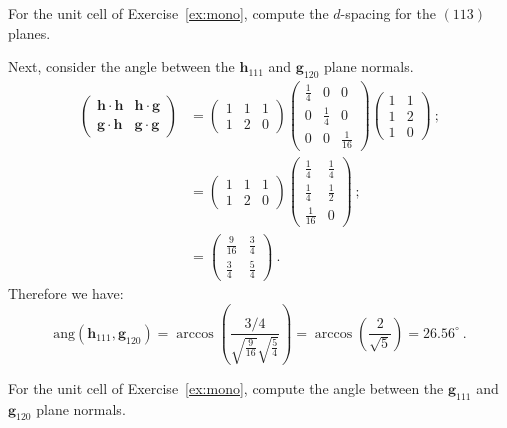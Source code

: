 \begin{exercise}
For the unit cell of Exercise~\ref{ex:mono}, compute the $d$-spacing for the $(113)$ planes.
\end{exercise}

\begin{example}
Next, consider the angle between the $\mathbf{h}_{111}$ and $\mathbf{g}_{120}$ plane normals.  
\begin{align*}
	\left(\begin{array}{cc}\mathbf{h}\cdot\mathbf{h}&\mathbf{h}\cdot\mathbf{g}\\
	\mathbf{g}\cdot\mathbf{h}&\mathbf{g}\cdot\mathbf{g}\end{array}\right) &= \left(\begin{array}{ccc}1 & 1 & 1\\ 1 & 2 & 0\end{array}\right)
	\left(\begin{array}{ccc}
			\frac{1}{4} & 0 & 0\\
			0 & \frac{1}{4} & 0\\
			0 & 0 & \frac{1}{16}\end{array}\right)\left(\begin{array}{cc} 1 & 1\\ 1 & 2\\ 1 & 0\end{array}\right)\ ;\\
	&= \left(\begin{array}{ccc}1 & 1 & 1\\ 1 & 2 & 0\end{array}\right)
	\left(\begin{array}{cc} \frac{1}{4} & \frac{1}{4}\\ \frac{1}{4} & \frac{1}{2}\\ \frac{1}{16} & 0\end{array}\right)\ ; \\
	&= \left(\begin{array}{cc}\frac{9}{16} & \frac{3}{4} \\ \frac{3}{4} & \frac{5}{4} \end{array}\right)\ .
\end{align*}
Therefore we have:
\[
	\text{ang}(\mathbf{h}_{111},\mathbf{g}_{120}) = \arccos\left(\frac{3/4}{\sqrt{\frac{9}{16}}\sqrt{\frac{5}{4}}}\right) = \arccos\left(\frac{2}{\sqrt{5}}\right) = 26.56^{\circ}\ .
\]
\end{example}

\begin{exercise}
For the unit cell of Exercise~\ref{ex:mono}, compute the angle between the $\mathbf{g}_{111}$ and $\mathbf{g}_{120}$ plane normals.
\end{exercise}



